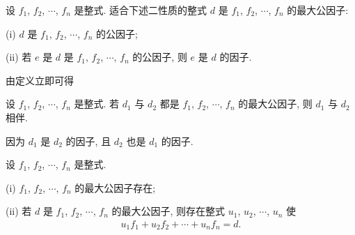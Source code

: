 \begin{definition}
    设 $f_1$, $f_2$, $\cdots$, $f_n$ 是整式. 适合下述二性质的整式 $d$ 是 $f_1$, $f_2$, $\cdots$, $f_n$ 的最大公因子:

    (i) $d$ 是 $f_1$, $f_2$, $\cdots$, $f_n$ 的公因子;

    (ii) 若 $e$ 是 $d$ 是 $f_1$, $f_2$, $\cdots$, $f_n$ 的公因子, 则 $e$ 是 $d$ 的因子.
\end{definition}

由定义立即可得
\begin{proposition}
    设 $f_1$, $f_2$, $\cdots$, $f_n$ 是整式. 若 $d_1$ 与 $d_2$ 都是 $f_1$, $f_2$, $\cdots$, $f_n$ 的最大公因子, 则 $d_1$ 与 $d_2$ 相伴.
\end{proposition}

\begin{pf}
    因为 $d_1$ 是 $d_2$ 的因子, 且 $d_2$ 也是 $d_1$ 的因子.
\end{pf}

\begin{proposition}
    设 $f_1$, $f_2$, $\cdots$, $f_n$ 是整式.

    (i) $f_1$, $f_2$, $\cdots$, $f_n$ 的最大公因子存在;

    (ii) 若 $d$ 是 $f_1$, $f_2$, $\cdots$, $f_n$ 的最大公因子, 则存在整式 $u_1$, $u_2$, $\cdots$, $u_n$ 使
    \begin{align*}
        u_1 f_1 + u_2 f_2 + \cdots + u_n f_n = d.
    \end{align*}
\end{proposition}

